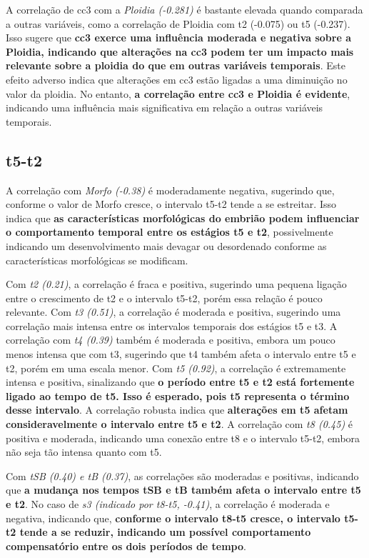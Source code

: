 A correlação de cc3 com a \textit{Ploidia (-0.281)} é bastante elevada quando comparada a outras variáveis, como a correlação de Ploidia com t2 (-0.075) ou t5 (-0.237). Isso sugere que \textbf{cc3 exerce uma influência moderada e negativa sobre a Ploidia, indicando que alterações na cc3 podem ter um impacto mais relevante sobre a ploidia do que em outras variáveis temporais}. Este efeito adverso indica que alterações em cc3 estão ligadas a uma diminuição no valor da ploidia. No entanto, \textbf{a correlação entre cc3 e Ploidia é evidente}, indicando uma influência mais significativa em relação a outras variáveis temporais.

\subsection*{t5-t2}
A correlação com \textit{Morfo (-0.38)} é moderadamente negativa, sugerindo que, conforme o valor de Morfo cresce, o intervalo t5-t2 tende a se estreitar. Isso indica que \textbf{as características morfológicas do embrião podem influenciar o comportamento temporal entre os estágios t5 e t2}, possivelmente indicando um desenvolvimento mais devagar ou desordenado conforme as características morfológicas se modificam.

Com \textit{t2 (0.21)}, a correlação é fraca e positiva, sugerindo uma pequena ligação entre o crescimento de t2 e o intervalo t5-t2, porém essa relação é pouco relevante. Com \textit{t3 (0.51)}, a correlação é moderada e positiva, sugerindo uma correlação mais intensa entre os intervalos temporais dos estágios t5 e t3. A correlação com \textit{t4 (0.39)} também é moderada e positiva, embora um pouco menos intensa que com t3, sugerindo que t4 também afeta o intervalo entre t5 e t2, porém em uma escala menor. Com \textit{t5 (0.92)}, a correlação é extremamente intensa e positiva, sinalizando que \textbf{o período entre t5 e t2 está fortemente ligado ao tempo de t5. Isso é esperado, pois t5 representa o término desse intervalo}. A correlação robusta indica que \textbf{alterações em t5 afetam consideravelmente o intervalo entre t5 e t2}. A correlação com \textit{t8 (0.45)} é positiva e moderada, indicando uma conexão entre t8 e o intervalo t5-t2, embora não seja tão intensa quanto com t5.

Com \textit{tSB (0.40) e tB (0.37)}, as correlações são moderadas e positivas, indicando que \textbf{a mudança nos tempos tSB e tB também afeta o intervalo entre t5 e t2}. No caso de \textit{s3 (indicado por t8-t5, -0.41)}, a correlação é moderada e negativa, indicando que, \textbf{conforme o intervalo t8-t5 cresce, o intervalo t5-t2 tende a se reduzir, indicando um possível comportamento compensatório entre os dois períodos de tempo}.

